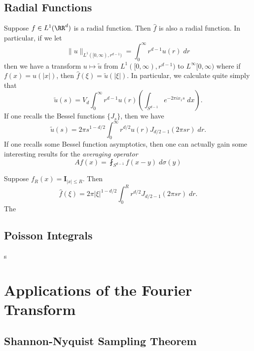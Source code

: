 \section{Radial Functions}

Suppose $f \in L^1(\RR^d)$ is a radial function. Then $\widehat{f}$ is also a radial function. In particular, if we let
%
\[ \| u \|_{L^1([0,\infty), r^{d-1})} = \int_0^\infty r^{d-1} u(r)\; dr \]
%
then we have a transform $u \mapsto \tilde{u}$ from $L^1([0,\infty), r^{d-1})$ to $L^\infty[0,\infty)$ where if $f(x) = u(|x|)$, then $\widehat{f}(\xi) = \tilde{u}(|\xi|)$. In particular, we calculate quite simply that
%
\[ \tilde{u}(s) = V_d \int_0^\infty r^{d-1} u(r) \left( \int_{S^{d-1}} e^{-2 \pi i x_1 s}\; dx \right). \]
%
If one recalls the Bessel functions $\{ J_s \}$, then we have
%
\[ \tilde{u}(s) = 2\pi s^{1 - d/2} \int_0^\infty r^{d/2} u(r) J_{d/2-1}(2 \pi s r)\; dr. \]
%
If one recalls some Bessel function asymptotics, then one can actually gain some interesting results for the \emph{averaging operator}
%
\[ Af(x) = \fint_{S^{d-1}} f(x-y)\; d\sigma(y) \]
%

\begin{example}
    Suppose $f_R(x) = \mathbf{I}_{|x| \leq R}$. Then
    \[ \widehat{f}(\xi) = 2 \pi |\xi|^{1-d/2} \int_0^R r^{d/2} J_{d/2-1}(2 \pi s r)\; dr. \]
    The 
\end{example}





\section{Poisson Integrals}

s



\chapter{Applications of the Fourier Transform}

\section{Shannon-Nyquist Sampling Theorem}

